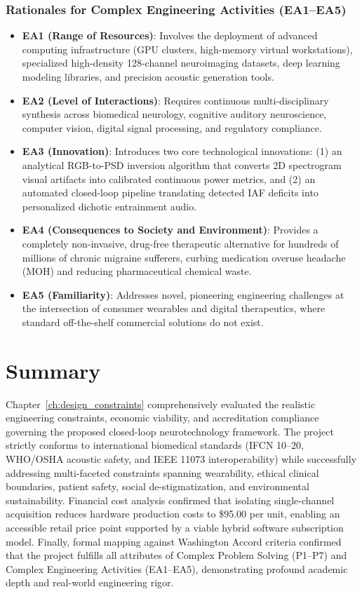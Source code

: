 \documentclass[12pt, a4paper]{report}
\begin{document}
\subsubsection{Rationales for Complex Engineering Activities (EA1--EA5)}
\begin{itemize}
    \item \textbf{EA1 (Range of Resources)}: Involves the deployment of advanced computing infrastructure (GPU clusters, high-memory virtual workstations), specialized high-density 128-channel neuroimaging datasets, deep learning modeling libraries, and precision acoustic generation tools.
    \item \textbf{EA2 (Level of Interactions)}: Requires continuous multi-disciplinary synthesis across biomedical neurology, cognitive auditory neuroscience, computer vision, digital signal processing, and regulatory compliance.
    \item \textbf{EA3 (Innovation)}: Introduces two core technological innovations: (1) an analytical RGB-to-PSD inversion algorithm that converts 2D spectrogram visual artifacts into calibrated continuous power metrics, and (2) an automated closed-loop pipeline translating detected IAF deficits into personalized dichotic entrainment audio.
    \item \textbf{EA4 (Consequences to Society and Environment)}: Provides a completely non-invasive, drug-free therapeutic alternative for hundreds of millions of chronic migraine sufferers, curbing medication overuse headache (MOH) and reducing pharmaceutical chemical waste.
    \item \textbf{EA5 (Familiarity)}: Addresses novel, pioneering engineering challenges at the intersection of consumer wearables and digital therapeutics, where standard off-the-shelf commercial solutions do not exist.
\end{itemize}

\section{Summary}
\label{sec:constraints_summary}
Chapter~\ref{ch:design_constraints} comprehensively evaluated the realistic engineering constraints, economic viability, and accreditation compliance governing the proposed closed-loop neurotechnology framework. The project strictly conforms to international biomedical standards (IFCN 10--20, WHO/OSHA acoustic safety, and IEEE 11073 interoperability) while successfully addressing multi-faceted constraints spanning wearability, ethical clinical boundaries, patient safety, social de-stigmatization, and environmental sustainability. Financial cost analysis confirmed that isolating single-channel acquisition reduces hardware production costs to \$95.00 per unit, enabling an accessible retail price point supported by a viable hybrid software subscription model. Finally, formal mapping against Washington Accord criteria confirmed that the project fulfills all attributes of Complex Problem Solving (P1--P7) and Complex Engineering Activities (EA1--EA5), demonstrating profound academic depth and real-world engineering rigor.
\end{document}

